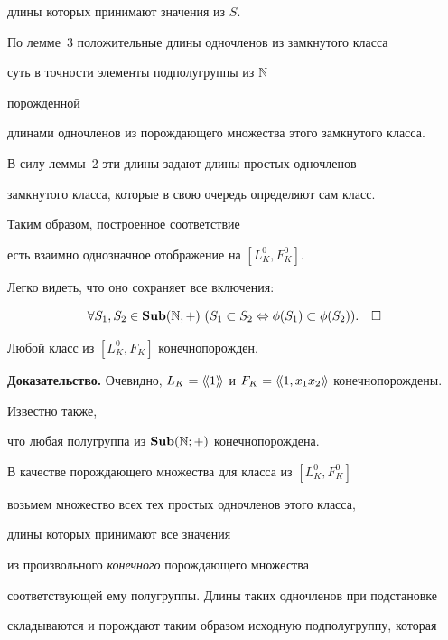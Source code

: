 длины которых принимают значения из $S$.


По лемме~3 положительные длины одночленов из замкнутого класса


суть в точности элементы подполугруппы из $\Bbb N$


порожденной


длинами одночленов из порождающего множества этого замкнутого класса.


В силу леммы~2 эти длины задают длины простых одночленов


замкнутого класса, которые в свою очередь определяют сам класс.


Таким образом, построенное соответствие


есть взаимно однозначное отображение на $[L^0_K,F^0_K]$.


Легко видеть, что оно сохраняет все включения: 


$$


\forall S_1,S_2\in \Sub (\Bbb N;+)\,\,


( S_1\subset S_2 \Leftrightarrow 


\phi (S_1)\subset \phi (S_2)).\quad\square


$$





\begin{cor}


Любой класс из $[L^0_K,F_K]$ конечнопорожден.


\end{cor}





{\bf Доказательство.}
Очевидно, $L_K={{\langle {\!{\langle {1}\rangle}\!}\rangle}}$ и $F_K={{\langle {\!{\langle {1, {x_1 x_2} }\rangle}\!}\rangle}}$ конечнопорождены. 


Известно также, 


что любая полугруппа из $\bold{Sub} (\Bbb N;+)$ конечнопорождена.


В качестве порождающего множества для класса из $[L^0_K,F^0_K]$


возьмем множество всех тех простых одночленов этого класса, 


длины которых принимают все значения 


из произвольного {\em конечного} порождающего множества


соответствующей ему полугруппы. Длины таких одночленов при подстановке


складываются и порождают таким образом исходную подполугруппу, которая


